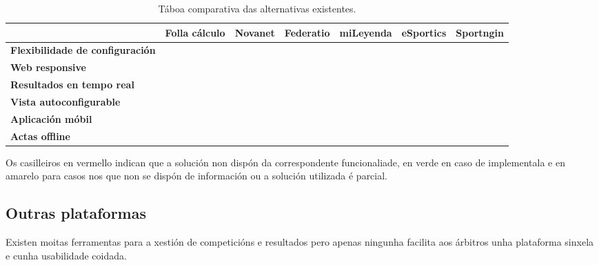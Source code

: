     \begin{table}[h]
      \centering
        \hspace*{-1.2cm}
        \begin{tabular}{| l | c | c | c | c | c | c |}
        \hline
           & Folla cálculo & Novanet & Federatio & miLeyenda & eSportics & 
Sportngin \\ \hline
    \textbf{Flexibilidade de configuración}  & 
\cellcolor{green!80!black} & \cellcolor{red} & \cellcolor{red} & 
\cellcolor{yellow} & \cellcolor{red} & \cellcolor{green!80!black} \\
\hline
    \textbf{Web responsive} & \cellcolor{red} & \cellcolor{green!80!black} & 
\cellcolor{red} &  \cellcolor{green!80!black} & \cellcolor{red} & 
\cellcolor{green!80!black} \\ \hline
    \textbf{Resultados en tempo real} & \cellcolor{red} & \cellcolor{red} & 
\cellcolor{yellow} & \cellcolor{green!80!black} & \cellcolor{yellow} & 
\cellcolor{green!80!black} \\
\hline
    \textbf{Vista autoconfigurable} & \cellcolor{red} & 
\cellcolor{red} & \cellcolor{red} & \cellcolor{green!80!black} & 
\cellcolor{red} & \cellcolor{green!80!black} \\
\hline
    \textbf{Aplicación móbil} & \cellcolor{red} & \cellcolor{red} & 
\cellcolor{red} & \cellcolor{green!80!black} & \cellcolor{red} & 
\cellcolor{green!80!black} \\
\hline
    \textbf{Actas offline} & \cellcolor{red} & \cellcolor{red} & 
\cellcolor{red} & \cellcolor{red} & \cellcolor{red} & \cellcolor{green!80!black} 
\\
\hline
        \end{tabular}
        \hspace*{-1.5cm}
        \caption{Táboa comparativa das alternativas 
existentes.}
      \label{table:competitors}
      \end{table}

            Os casilleiros en vermello indican que a solución non dispón da 
correspondente funcionaliade, en verde en caso de implementala e en amarelo 
para casos nos que non se dispón de información ou a solución utilizada é 
parcial.

    \subsection{Outras plataformas}
    Existen moitas ferramentas para a xestión de competicións e resultados pero apenas 
ningunha facilita aos árbitros unha plataforma sinxela e cunha 
usabilidade coidada.

